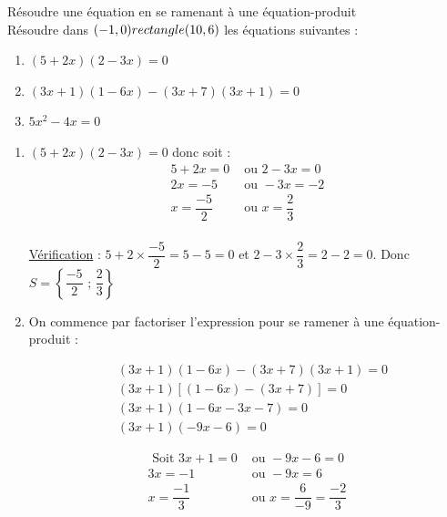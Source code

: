 \begin{Méthode}Résoudre une équation en se ramenant à une équation-produit \\
Résoudre dans $(-1,0) rectangle (10,6)$ les équations suivantes : 

\begin{enumerate}

\item $(5 + 2x)(2 - 3x)=0$ 
\item $(3x+1)(1-6x)-(3x+7)(3x+1)=0$
\item $ 5x^2-4x=0$

\end{enumerate}
\vspace{0.5cm}
\begin{enumerate}
\item $(5 + 2x)(2 - 3x)=0$ donc soit : \begin{align*}
5+2x=0 & \text{ ou } 2-3x=0 \\
2x=-5 & \text{ ou } -3x=-2 \\
x=\dfrac{-5}{2} & \text{ ou } x=\dfrac{2}{3} \\
\end{align*}

\underline{Vérification} : $5+2\times \dfrac{-5}{2}=5-5=0$ et $2-3\times\dfrac{2}{3}=2-2=0$. Donc $S=\left\{\dfrac{-5}{2} \text{ ; } \dfrac{2}{3}\right\}$

\item On commence par factoriser l'expression pour se ramener à une équation-produit :\\

\begin{minipage}[c]{0.45\linewidth}
\begin{align*}
&(3x + 1)(1 - 6x) - (3x + 7)(3x + 1) = 0 \\
&(3x + 1)[(1 - 6x) - (3x + 7)] = 0\\
&(3x + 1)(1 - 6x -3x - 7) = 0\\
&(3x + 1)(- 9x - 6) = 0
\end{align*}
\end{minipage} \hfill
\begin{minipage}[c]{0.45\linewidth}
\begin{align*}
\text{ Soit } 3x + 1 = 0 &\text{ ou } - 9x - 6 = 0\\
3x = -1 &\text{ ou } - 9x = 6\\
x=\dfrac{-1}{3} &\text{ ou } x=\dfrac{6}{-9}=\dfrac{-2}{3}
\end{align*}


\end{minipage}
\end{enumerate}
\end{Méthode}
